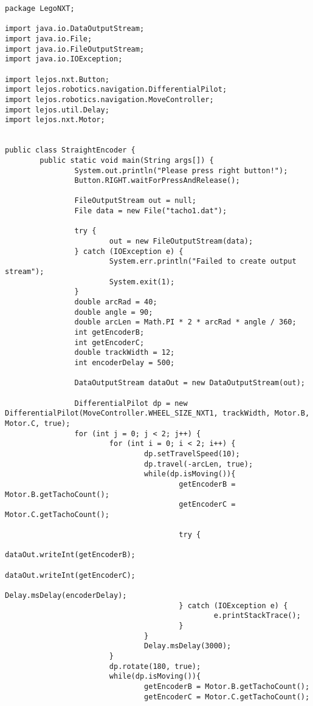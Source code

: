 \documentclass[a4paper, 12pt]{article}
\begin{document}
\begin{lstlisting}
package LegoNXT;

import java.io.DataOutputStream;
import java.io.File;
import java.io.FileOutputStream;
import java.io.IOException;

import lejos.nxt.Button;
import lejos.robotics.navigation.DifferentialPilot;
import lejos.robotics.navigation.MoveController;
import lejos.util.Delay;
import lejos.nxt.Motor;


public class StraightEncoder {
        public static void main(String args[]) {
                System.out.println("Please press right button!");
                Button.RIGHT.waitForPressAndRelease();

                FileOutputStream out = null;
                File data = new File("tacho1.dat");

                try {
                        out = new FileOutputStream(data);
                } catch (IOException e) {
                        System.err.println("Failed to create output stream");
                        System.exit(1);
                }
                double arcRad = 40;
                double angle = 90;
                double arcLen = Math.PI * 2 * arcRad * angle / 360;
                int getEncoderB;
                int getEncoderC;
                double trackWidth = 12;
                int encoderDelay = 500;

                DataOutputStream dataOut = new DataOutputStream(out);

                DifferentialPilot dp = new DifferentialPilot(MoveController.WHEEL_SIZE_NXT1, trackWidth, Motor.B, Motor.C, true);
                for (int j = 0; j < 2; j++) {
                        for (int i = 0; i < 2; i++) {
                                dp.setTravelSpeed(10);
                                dp.travel(-arcLen, true);
                                while(dp.isMoving()){
                                        getEncoderB = Motor.B.getTachoCount();
                                        getEncoderC = Motor.C.getTachoCount();

                                        try {
                                                dataOut.writeInt(getEncoderB);
                                                dataOut.writeInt(getEncoderC);
                                                Delay.msDelay(encoderDelay);
                                        } catch (IOException e) {
                                                e.printStackTrace();
                                        }
                                }
                                Delay.msDelay(3000);
                        }
                        dp.rotate(180, true);
                        while(dp.isMoving()){
                                getEncoderB = Motor.B.getTachoCount();
                                getEncoderC = Motor.C.getTachoCount();


\end{lstlisting}
\end{document}
